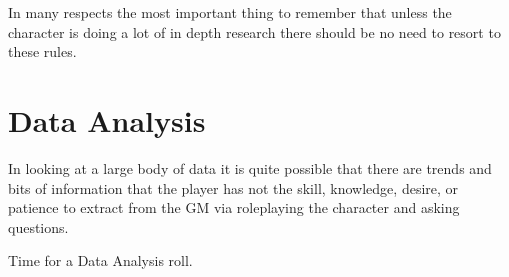 In many respects the most important thing to remember that unless the 
character is doing a lot of in depth research there should be no need 
to resort to these rules.

\section{Data Analysis}

In looking at a large body of data it is quite possible that there 
are trends and bits of information that the player has not the skill, 
knowledge, desire, or patience to extract from the GM via roleplaying 
the character and asking questions. 

Time for a Data Analysis roll.
